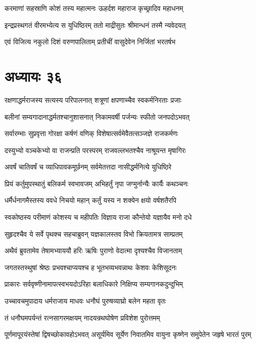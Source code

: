 \twolineshloka
{करमाणां सहस्राणि कोशं तस्य महात्मनः}
{ऊहर्दश महाराज कृच्छ्रादिव महाधनम्}


\twolineshloka
{इन्द्रप्रस्थगतं वीरमभ्येत्य स युधिष्ठिरम्}
{ततो माद्रीसुतः श्रीमान्धनं तस्मै न्यवेदयत्}


\twolineshloka
{एवं विजित्य नकुलो दिशं वरुणपालिताम्}
{प्रतीचीं वासुदेवेन निर्जितां भरतर्षभ}


\chapter{अध्यायः ३६}
\twolineshloka
{रक्षणाद्धर्मराजस्य सत्यस्य परिपालनात्}
{शत्रूणां क्षपणाच्चैव स्वकर्मनिरताः प्रजाः}


\twolineshloka
{बलीनां सम्यगादानाद्धर्मतश्चानुशासनात्}
{निकामवर्षी पर्जन्यः स्फीतो जनपदोऽभवत्}


\twolineshloka
{सर्वारम्भाः सुप्रवृत्ता गोरक्षा कर्षणं वणिक्}
{विशेषात्सर्वमेवैतत्सञ्जज्ञे राजकर्मणः}


\twolineshloka
{दस्युभ्यो वञ्चकेभ्यो वा राजन्प्रति परस्परम्}
{राजवल्लभतश्चैव नाश्रूयन्त मृषागिरः}


\twolineshloka
{अवर्षं चातिवर्षं च व्याधिपावकमूर्छनम्}
{सर्वमेतत्तदा नासीद्धर्मनित्ये युधिष्ठिरे}


\twolineshloka
{प्रियं कर्तुमुपस्थातुं बलिकर्म स्वभावजम्}
{अभिहर्तुं नृपा जग्मुर्नान्यैः कार्यैः कथञ्चनः}


\twolineshloka
{धर्मैर्धनागमैस्तस्य ववधे निचयो महान्}
{कर्तुं यस्य न शक्येन क्षयो वर्षशतैरपि}


\twolineshloka
{स्वकोष्ठस्य परीमाणं कोशस्य च महीपतिः}
{विज्ञाय राजा कौन्तेयो यज्ञायैव मनो दधे}


\twolineshloka
{सुहृदश्चैव ये सर्वे पृथक्च सहचाब्रुवन्}
{यज्ञकालस्तव विभो क्रियतामत्र साम्प्रतम्}


\twolineshloka
{अथैवं ब्रुवतामेव तेषामभ्याययौ हरिः}
{ऋषिः पुराणो वेदात्मा दृश्यश्चैव विजानताम्}


\twolineshloka
{जगतस्तस्थुषां श्रेष्ठः प्रभवश्चाप्ययश्च ह}
{भूतभव्यभवन्नाथः केशवः केशिसूदनः}


\twolineshloka
{प्राकारः सर्ववृष्णीनामापत्स्वभयदोऽरिहा}
{बलाधिकारे निक्षिप्य सम्यगानकदुन्दुभिम्}


\twolineshloka
{उच्चावचमुपादाय धर्मराजाय माधवः}
{धनौघं पुरुषव्याघ्रो बलेन महता वृतः}


\twolineshloka
{तं धनौघमपर्यन्तं रत्नसागरमक्षयम्}
{नादयन्रथघोषेण प्रविशेश पुरोत्तमम्}


\threelineshloka
{पूर्णमापूरयंस्तेषां द्विषच्छोकावहोऽभवत्}
{असूर्यमिव सूर्येण निवातमिव वायुना}
{कृष्णेन समुपेतेन जहृषे भारतं पुरम्}


